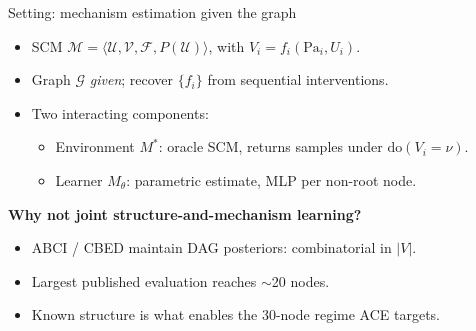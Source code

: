 \documentclass[aspectratio=169,10pt]{beamer}
\begin{document}
\begin{frame}{Setting: mechanism estimation given the graph}
\begin{itemize}
  \item SCM $\mathcal{M}=\langle\mathcal{U},\mathcal{V},\mathcal{F},P(\mathcal{U})\rangle$, with
        $V_i = f_i(\text{Pa}_i, U_i)$.
  \item Graph $\mathcal{G}$ \emph{given}; recover $\{f_i\}$ from sequential interventions.
  \item Two interacting components:
        \begin{itemize}
          \item Environment $M^*$: oracle SCM, returns samples under $\text{do}(V_i\!=\!\nu)$.
          \item Learner $M_\theta$: parametric estimate, MLP per non-root node.
        \end{itemize}
\end{itemize}
\vspace{0.3em}
\textbf{Why not joint structure-and-mechanism learning?}
\begin{itemize}
  \item ABCI / CBED maintain DAG posteriors: combinatorial in $|V|$.
  \item Largest published evaluation reaches $\sim$20 nodes.
  \item Known structure is what enables the 30-node regime ACE targets.
\end{itemize}
\end{frame}
\end{document}
